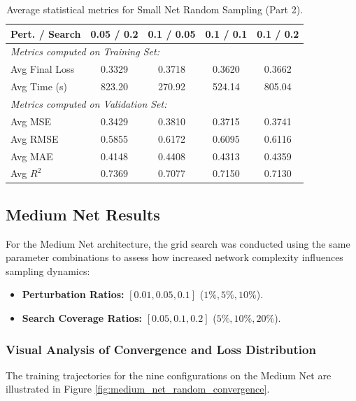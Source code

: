 \begin{table}[h]
\centering
\scriptsize
\begin{tabular}{|l|c|c|c|c|}
\hline
\textbf{Pert. / Search} & \textbf{0.05 / 0.2} & \textbf{0.1 / 0.05} & \textbf{0.1 / 0.1} & \textbf{0.1 / 0.2} \\ \hline
\multicolumn{5}{|l|}{\textit{Metrics computed on Training Set:}} \\ \hline
Avg Final Loss & 0.3329 & 0.3718 & 0.3620 & 0.3662 \\ \hline
Avg Time (s)   & 823.20 & 270.92 & 524.14 & 805.04 \\ \hline
\multicolumn{5}{|l|}{\textit{Metrics computed on Validation Set:}} \\ \hline
Avg MSE        & 0.3429 & 0.3810 & 0.3715 & 0.3741 \\ \hline
Avg RMSE       & 0.5855 & 0.6172 & 0.6095 & 0.6116 \\ \hline
Avg MAE        & 0.4148 & 0.4408 & 0.4313 & 0.4359 \\ \hline
Avg $R^2$      & 0.7369 & 0.7077 & 0.7150 & 0.7130 \\ \hline
\end{tabular}
\caption{Average statistical metrics for Small Net Random Sampling (Part 2).}
\label{tab:small_net_random_part2}
\end{table}

\newpage

\subsection{Medium Net Results}

For the Medium Net architecture, the grid search was conducted using the same parameter combinations to assess how increased network complexity influences sampling dynamics:
\begin{itemize}
    \item \textbf{Perturbation Ratios:} $[0.01, 0.05, 0.1]$ ($1\%, 5\%, 10\%$).
    \item \textbf{Search Coverage Ratios:} $[0.05, 0.1, 0.2]$ ($5\%, 10\%, 20\%$).

\end{itemize}


\subsubsection{Visual Analysis of Convergence and Loss Distribution}

The training trajectories for the nine configurations on the Medium Net are illustrated in Figure \ref{fig:medium_net_random_convergence}.

